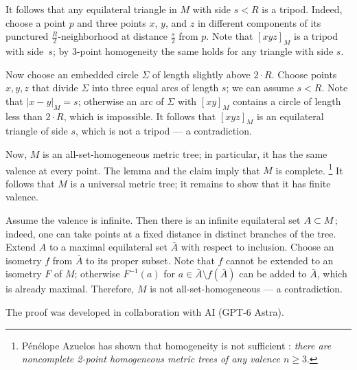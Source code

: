 \documentclass[leqno,a4paper,10pt]{article}
\begin{document}
It follows that any equilateral triangle in $M$ with side $s<R$ is a tripod.
Indeed, choose a point $p$ and three points $x$, $y$, and $z$ in different components of its punctured $\tfrac R2$-neighborhood at distance $\tfrac s2$ from $p$.
Note that $[xyz]_M$ is a tripod with side~$s$; by 3-point homogeneity the same holds for any triangle with side $s$.

Now choose an embedded circle $\Sigma$ of length slightly above $2\cdot R$.
Choose points $x,y,z$ that divide $\Sigma$ into three equal arcs of length $s$; we can assume  $s<R$.
Note that $|x-y|_M=s$; otherwise an arc of $\Sigma$ with $[xy]_M$ contains a circle of length less than $2\cdot R$, which is impossible.
It follows that $[xyz]_M$ is an equilateral triangle of side $s$, which is not a tripod --- a contradiction.

Now, $M$ is an all-set-homogeneous metric tree; in particular, it has the same valence at every point.
The lemma and the claim imply that $M$ is complete.%
\footnote{Pénélope Azuelos has shown that homogeneity is not sufficient \cite{azuelos2025}: \emph{there are noncomplete 2-point homogeneous metric trees  of any valence $n\ge 3$}.}
It follows that $M$ is a universal metric tree;
it remains to show that it has finite valence.

Assume the valence is infinite.
Then there is an infinite equilateral set $A\z\subset M$; indeed, one can take points at a fixed distance in distinct branches of the tree.
Extend $A$ to a maximal equilateral set  $\bar A$ with respect to inclusion.
Choose an isometry $f$ from $\bar A$ to its proper subset.
Note that $f$ cannot be extended to an isometry $F$ of $M$; otherwise $F^{-1}(a)$ for $a\in \bar A\setminus f(\bar A)$ can be added to $\bar A$, which is already maximal.
Therefore, $M$ is not all-set-homogeneous --- a contradiction.
\qeds


The proof was developed in collaboration with AI (GPT-6 Astra).

{\sloppy
\printbibliography[heading=bibintoc]
\fussy
}
\end{document}
